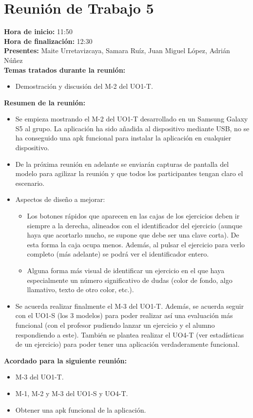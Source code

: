 \section*{Reunión de Trabajo 5}

\textbf{Hora de inicio:} 11:50\\

\textbf{Hora de finalización:} 12:30\\

\textbf{Presentes:} Maite Urretavizcaya, Samara Ruíz, Juan Miguel López, Adrián Núñez\\

\textbf{Temas tratados durante la reunión:}

\begin{itemize}
\item Demostración y discusión del M-2 del UO1-T.
\end{itemize}

\textbf{Resumen de la reunión:}

\begin{itemize}
\item Se empieza mostrando el M-2 del UO1-T desarrollado en un Samsung Galaxy S5 al grupo. La aplicación ha sido añadida al dispositivo mediante USB, no se ha conseguido una apk funcional para instalar la aplicación en cualquier dispositivo.

\item De la próxima reunión en adelante se enviarán capturas de pantalla del modelo para agilizar la reunión y que todos los participantes tengan claro el escenario.

\item Aspectos de diseño a mejorar:
	\begin{itemize}
	\item Los botones rápidos que aparecen en las cajas de los ejercicios deben ir siempre a la derecha, alineados con el 		identificador del ejercicio (aunque haya que acortarlo mucho, se supone que debe ser una clave corta). De esta forma 		la caja ocupa menos. Además, al pulsar el ejercicio para verlo completo (más adelante) se podrá ver el identificador 		entero.
	\item Alguna forma más visual de identificar un ejercicio en el que haya especialmente un número significativo de 			dudas (color de fondo, algo llamativo, texto de otro color, etc.).
	\end{itemize}

\item Se acuerda realizar finalmente el M-3 del UO1-T. Además, se acuerda seguir con el UO1-S (los 3 modelos) para poder realizar así una evaluación más funcional (con el profesor pudiendo lanzar un ejercicio y el alumno respondiendo a este). También se plantea realizar el UO4-T (ver estadísticas de un ejercicio) para poder tener una aplicación verdaderamente funcional.
\end{itemize}

\textbf{Acordado para la siguiente reunión:}

\begin{itemize}
\item M-3 del UO1-T.
\item M-1, M-2 y M-3 del UO1-S y UO4-T.
\item Obtener una apk funcional de la aplicación.
\end{itemize}